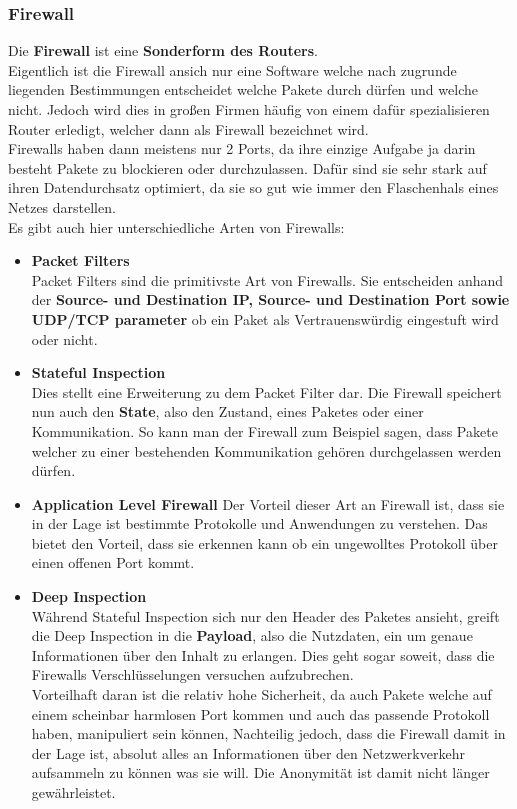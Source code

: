 \documentclass[12pt,a4paper]{report}
\begin{document}
\subsubsection{Firewall}
Die \textbf{Firewall} ist eine \textbf{Sonderform des Routers}.\\
Eigentlich ist die Firewall ansich nur eine Software welche nach zugrunde liegenden Bestimmungen entscheidet welche Pakete durch dürfen und welche nicht. Jedoch wird dies in großen Firmen häufig von einem dafür spezialisieren Router erledigt, welcher dann als Firewall bezeichnet wird.\\
Firewalls haben dann meistens nur 2 Ports, da ihre einzige Aufgabe ja darin besteht Pakete zu blockieren oder durchzulassen. Dafür sind sie sehr stark auf ihren Datendurchsatz optimiert, da sie so gut wie immer den Flaschenhals eines Netzes darstellen.\\
Es gibt auch hier unterschiedliche Arten von Firewalls:\\
\begin{itemize}
\item \textbf{Packet Filters}\\
Packet Filters sind die primitivste Art von Firewalls. Sie entscheiden anhand der \textbf{Source- und Destination IP, Source- und Destination Port sowie UDP/TCP parameter} ob ein Paket als Vertrauenswürdig eingestuft wird oder nicht.
\item \textbf{Stateful Inspection}\\
Dies stellt eine Erweiterung zu dem Packet Filter dar. Die Firewall speichert nun auch den \textbf{State}, also den Zustand, eines Paketes oder einer Kommunikation. So kann man der Firewall zum Beispiel sagen, dass Pakete welcher zu einer bestehenden Kommunikation gehören durchgelassen werden dürfen. 
\item \textbf{Application Level Firewall}
Der Vorteil dieser Art an Firewall ist, dass sie in der Lage ist bestimmte Protokolle und Anwendungen zu \glqq verstehen\grqq . Das bietet den Vorteil, dass sie erkennen kann ob ein ungewolltes Protokoll über einen offenen Port kommt.
\item \textbf{Deep Inspection}\\
Während Stateful Inspection sich nur den Header des Paketes ansieht, greift die Deep Inspection in die \textbf{Payload}, also die Nutzdaten, ein um genaue Informationen über den Inhalt zu erlangen. Dies geht sogar soweit, dass die Firewalls Verschlüsselungen versuchen aufzubrechen.\\
Vorteilhaft daran ist die relativ hohe Sicherheit, da auch Pakete welche auf einem scheinbar harmlosen Port kommen und auch das passende Protokoll haben, manipuliert sein können, Nachteilig jedoch, dass die Firewall damit in der Lage ist, absolut alles an Informationen über den Netzwerkverkehr aufsammeln zu können was sie will. Die Anonymität ist damit nicht länger gewährleistet.
\end{itemize}
\end{document}
